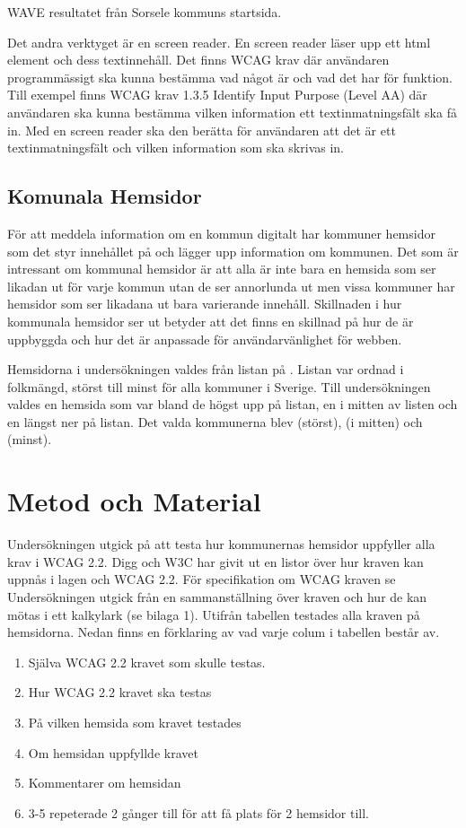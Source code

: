 \documentclass[11p]{article}
\begin{document}
    WAVE resultatet från Sorsele kommuns startsida.

    Det andra verktyget är en screen reader.
    En screen reader läser upp ett html element och dess textinnehåll.
    Det finns WCAG krav där användaren programmässigt ska kunna bestämma vad något är och vad det har för funktion.
    Till exempel finns WCAG krav 1.3.5 Identify Input Purpose (Level AA) där användaren ska kunna bestämma vilken information ett textinmatningsfält ska få in.
    Med en screen reader ska den berätta för användaren att det är ett textinmatningsfält och vilken information som ska skrivas in.

    \subsection{Komunala Hemsidor}
    För att meddela information om en kommun digitalt har kommuner hemsidor som det styr innehållet på och lägger upp information om kommunen.
    Det som är intressant om kommunal hemsidor är att alla är inte bara en hemsida som ser likadan ut för varje kommun utan de ser annorlunda ut men vissa kommuner har hemsidor som ser likadana ut bara varierande innehåll.
    Skillnaden i hur kommunala hemsidor ser ut betyder att det finns en skillnad på hur de är uppbyggda och hur det är anpassade för användarvänlighet för webben.
    
    Hemsidorna i undersökningen valdes från listan på \textcite{SverigesKommuner}.
    Listan var ordnad i folkmängd, störst till minst för alla kommuner i Sverige.
    Till undersökningen valdes en hemsida som var bland de högst upp på listan, en i mitten av listen och en längst ner på listan.
    Det valda kommunerna blev \textcite{Linköpings_kommun} (störst), \textcite{Höörs_kommun} (i mitten) och \textcite{Sorsele_kommun} (minst).
    
    \section{Metod och Material}

    Undersökningen utgick på att testa hur kommunernas hemsidor uppfyller alla krav i WCAG 2.2.
    Digg och W3C har givit ut en listor över hur kraven kan uppnås i lagen och WCAG 2.2.
    För specifikation om WCAG kraven se \textcite{WCAG_2.2}
    Undersökningen utgick från en sammanställning över kraven och hur de kan mötas i ett kalkylark (se bilaga 1).
    Utifrån tabellen testades alla kraven på hemsidorna.
    Nedan finns en förklaring av vad varje colum i tabellen består av.
    \begin{enumerate}
        \item Själva WCAG 2.2 kravet som skulle testas.
        \item Hur WCAG 2.2 kravet ska testas
        \item På vilken hemsida som kravet testades
        \item Om hemsidan uppfyllde kravet
        \item Kommentarer om hemsidan
        \item 3-5 repeterade 2 gånger till för att få plats för 2 hemsidor till.
    \end{enumerate}
\end{document}
